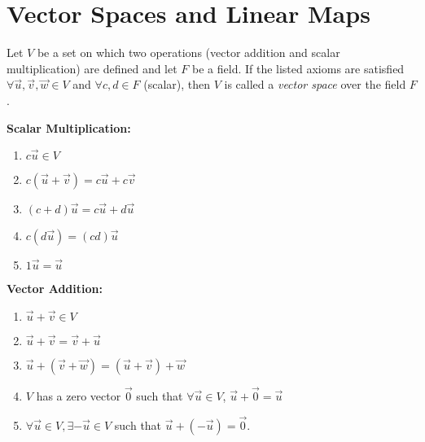 \section{Vector Spaces and Linear Maps}

\begin{definition} \label{vectspace}
	\cite{larson}Let $V$ be a set on which two operations (vector addition and scalar multiplication) are defined and let $F$ be a field. If the listed axioms are satisfied $\forall \vec{u},\vec{v},\vec{w} \in V$ and $\forall c,d \in F$ (scalar), then $V$ is called a \emph{vector space} over the field $F$.
	\begin{varwidth}[t]{.35\textwidth}
\textbf{Scalar Multiplication:}
\begin{enumerate}
\item $c\vec{u} \in V$
\item $c(\vec{u}+\vec{v}) = c\vec{u}+c\vec{v}$
\item $(c+d)\vec{u} = c\vec{u}+d\vec{u}$
\item $c(d\vec{u}) = (cd)\vec{u}$
\item $1\vec{u} = \vec{u}$
\end{enumerate}
\end{varwidth}%
\begin{varwidth}[t]{.65\textwidth}
\textbf{Vector Addition:} 
\begin{enumerate}
\item $\vec{u}+\vec{v} \in V$
\item $\vec{u}+\vec{v} = \vec{v}+\vec{u}$
\item $\vec{u}+(\vec{v}+\vec{w}) = (\vec{u}+\vec{v})+\vec{w}$
\item $V$ has a zero vector $\vec{0}$ such that $\forall \vec{u} \in V$, $\vec{u}+\vec{0} = \vec{u}$
\item $\forall \vec{u} \in V, \exists -\vec{u} \in V$ such that $\vec{u}+(-\vec{u}) = \vec{0}$.
\end{enumerate}
\end{varwidth}
\newline
\end{definition}

\newline
\newline

